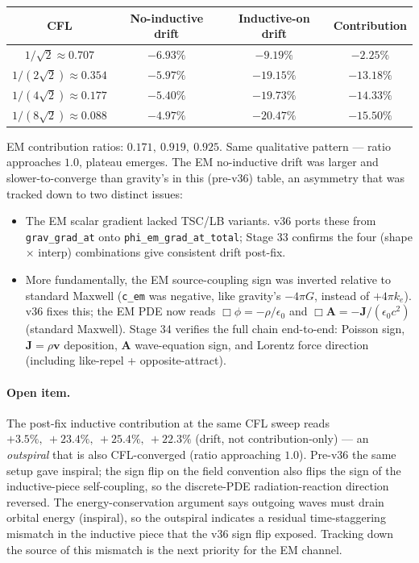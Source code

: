 \documentclass[11pt,a4paper]{article}
\newcommand{\vv}[1]{\mathbf{#1}}
\begin{document}
\begin{center}
\begin{tabular}{@{}cccc@{}}
\toprule
\textbf{CFL} & \textbf{No-inductive drift} & \textbf{Inductive-on drift} & \textbf{Contribution} \\
\midrule
$1/\sqrt{2}      \approx 0.707$ & $-6.93\%$ & $-9.19\%$  & $-2.25\%$ \\
$1/(2\sqrt{2})   \approx 0.354$ & $-5.97\%$ & $-19.15\%$ & $-13.18\%$ \\
$1/(4\sqrt{2})   \approx 0.177$ & $-5.40\%$ & $-19.73\%$ & $-14.33\%$ \\
$1/(8\sqrt{2})   \approx 0.088$ & $-4.97\%$ & $-20.47\%$ & $-15.50\%$ \\
\bottomrule
\end{tabular}
\end{center}

EM contribution ratios: $0.171,\ 0.919,\ 0.925$.  Same qualitative
pattern --- ratio approaches $1.0$, plateau emerges.  The EM
no-inductive drift was larger and slower-to-converge than gravity's
in this (pre-v36) table, an asymmetry that was tracked down to two
distinct issues:
\begin{itemize}
  \item The EM scalar gradient lacked TSC/LB variants.  v36 ports
        these from \texttt{grav\_grad\_at} onto
        \texttt{phi\_em\_grad\_at\_total}; Stage 33 confirms the four
        (shape $\times$ interp) combinations give consistent drift
        post-fix.
  \item More fundamentally, the EM source-coupling sign was inverted
        relative to standard Maxwell (\texttt{c\_em} was negative,
        like gravity's $-4\pi G$, instead of $+4\pi k_e$).  v36 fixes
        this; the EM PDE now reads $\Box \phi = -\rho/\epsilon_0$ and
        $\Box \vv{A} = -\vv{J}/(\epsilon_0 c^2)$ (standard Maxwell).
        Stage 34 verifies the full chain end-to-end:
        Poisson sign, $\vv{J}=\rho\vv{v}$ deposition, $\vv{A}$
        wave-equation sign, and Lorentz force direction (including
        like-repel + opposite-attract).
\end{itemize}
\paragraph{Open item.}  The post-fix inductive contribution at the
same CFL sweep reads $+3.5\%,\ +23.4\%,\ +25.4\%,\ +22.3\%$ (drift,
not contribution-only) --- an \emph{outspiral} that is also
CFL-converged (ratio approaching $1.0$).  Pre-v36 the same setup
gave inspiral; the sign flip on the field convention also flips the
sign of the inductive-piece self-coupling, so the discrete-PDE
radiation-reaction direction reversed.  The energy-conservation
argument says outgoing waves must drain orbital energy (inspiral),
so the outspiral indicates a residual time-staggering mismatch in
the inductive piece that the v36 sign flip exposed.  Tracking down
the source of this mismatch is the next priority for the EM channel.
\end{document}
